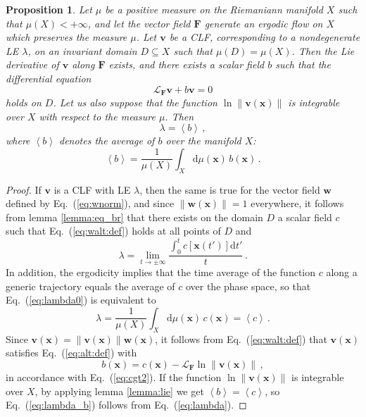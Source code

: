 \documentclass{article}
\theoremstyle{plain}
\newtheorem{proposition}[theorem]{Proposition}
\theoremstyle{definition}
\theoremstyle{remark}
\newcommand{\vect}[1]{\boldsymbol{#1}}
\begin{document}
\begin{proposition}  \label{prop:1}
Let $\mu$ be a positive measure on the Riemaniann manifold $X$ such
that $\mu(X)<+\infty$, and let the vector field $\vect{F}$ generate an
ergodic flow on $X$ which preserves the measure $\mu$.  Let $\vect{v}$
be a CLF, corresponding to a nondegenerate LE $\lambda$, on an
invariant domain \mbox{$D\subseteq X$} such that $\mu(D)=\mu(X)$.
Then the Lie derivative of $\vect{v}$ along $\vect{F}$ exists, and
there exists a scalar field $b$ such that the differential equation 
\[
 \mathcal{L}_{\vect{F}} \vect{v} + b \vect v = 0 
\]
holds on $D$. 
Let us also suppose that the function 
$\ln \lVert \vect{v}\left(\vect {x}\right) \rVert$ is integrable over $X$ 
with respect to the measure $\mu$. Then
  \begin{equation}\label{eq:lambda_b}
    \lambda=\left<b\right>\,, 
  \end{equation}
  where $\left<b\right>$ denotes the
  average of $b$ over the manifold $X$:
  \begin{equation}\label{eq:aver_b}
    \left<b\right>=  \frac {1}{\mu(X)}
    \int_X \mathrm{d}\mu (\vect{x})\, b(\vect{x}) \, .
  \end{equation}
\end{proposition}

\begin{proof}
If $\vect v$ is  a CLF with LE $\lambda$, then the same is true for
the vector field $\vect w$ defined by Eq.~(\ref{eq:wnorm}), and
since $\lVert \vect{w}\left(\vect {x}\right) \rVert=1$ everywhere,
it follows from lemma \ref{lemma:eq_br} that
there exists on the domain $D$
a scalar field $c$ such that Eq.~(\ref{eq:walt:def}) holds at
all points of $D$ and
\begin{equation}\label{eq:lambda0}
\lambda=
\lim_{t\to \pm\infty}\frac{\int_0^t c\left[\vect{x}(t')\right]
{\mathrm{d}}t'}{t} \,.
\end{equation}
  In addition, the ergodicity implies that the time average 
  of the function $c$ along a generic trajectory equals the average of $c$
  over the phase space, so that Eq.~(\ref{eq:lambda0}) is equivalent to
\begin{equation}\label{eq:lambda}
\lambda= \frac {1}{\mu(X)}
    \int_X \mathrm{d}\mu (\vect{x})\, c(\vect{x})
=\left<c\right>\,.
\end{equation}
Since $\vect v(\vect x)=\lVert \vect v(\vect x)\rVert \vect w(\vect x)$,
it follows from Eq.~(\ref{eq:walt:def})
that $\vect{v}(\vect{x})$ satisfies Eq.~(\ref{eq:alt:def})
with 
\begin{equation}\label{eq:bb}
b(\vect{x})=c(\vect{x})-\mathcal{L}_{\vect{F}}
\ln \lVert \vect{v}\left(\vect {x}\right) \rVert \,,
\end{equation}
in accordance with Eq.~(\ref{eq:cgt2}).
If the function $\ln \lVert \vect{v}\left(\vect {x}\right) \rVert$ is 
integrable  over $X$, by applying lemma \ref{lemma:lie}
we get $\left<b\right>=\left<c\right>$, so Eq.~(\ref{eq:lambda_b})
follows from Eq.~(\ref{eq:lambda}).
\end{proof}
\end{document}
